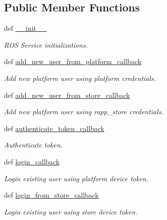 \subsection*{Public Member Functions}
\begin{DoxyCompactItemize}
\item 
def \hyperlink{classrapp__application__authentication__manager_1_1application__authentication__node_1_1ApplicationAuthenticationManager_aae80eb82e0c244b5149f3ab2c4fc14c1}{\-\_\-\-\_\-init\-\_\-\-\_\-}
\begin{DoxyCompactList}\small\item\em R\-O\-S Service initializations. \end{DoxyCompactList}\item 
def \hyperlink{classrapp__application__authentication__manager_1_1application__authentication__node_1_1ApplicationAuthenticationManager_af33d953e7f05fe1d0c9a62ece6402724}{add\-\_\-new\-\_\-user\-\_\-from\-\_\-platform\-\_\-callback}
\begin{DoxyCompactList}\small\item\em Add new platform user using platform credentials. \end{DoxyCompactList}\item 
def \hyperlink{classrapp__application__authentication__manager_1_1application__authentication__node_1_1ApplicationAuthenticationManager_a73cd0709502565c55f961a759b953ced}{add\-\_\-new\-\_\-user\-\_\-from\-\_\-store\-\_\-callback}
\begin{DoxyCompactList}\small\item\em Add new platform user using rapp\-\_\-store credentials. \end{DoxyCompactList}\item 
def \hyperlink{classrapp__application__authentication__manager_1_1application__authentication__node_1_1ApplicationAuthenticationManager_ab99515d6978f8acb3f73dc48a8386bb7}{authenticate\-\_\-token\-\_\-callback}
\begin{DoxyCompactList}\small\item\em Authenticate token. \end{DoxyCompactList}\item 
def \hyperlink{classrapp__application__authentication__manager_1_1application__authentication__node_1_1ApplicationAuthenticationManager_ad741850fc28c535bfbca57bc5c80562d}{login\-\_\-callback}
\begin{DoxyCompactList}\small\item\em Login existing user using platform device token. \end{DoxyCompactList}\item 
def \hyperlink{classrapp__application__authentication__manager_1_1application__authentication__node_1_1ApplicationAuthenticationManager_a06aa5d640269fbf99e3e7d2f8b694ab8}{login\-\_\-from\-\_\-store\-\_\-callback}
\begin{DoxyCompactList}\small\item\em Login existing user using store device token. \end{DoxyCompactList}\end{DoxyCompactItemize}
